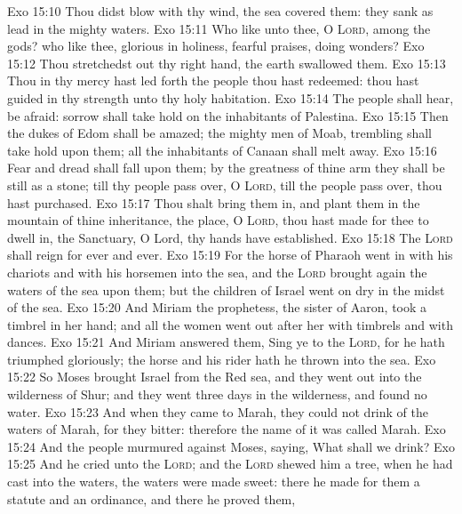 \vs Exo 15:10 Thou didst blow with thy wind, the sea covered them: they sank as lead in the mighty waters.
\vs Exo 15:11 Who  like unto thee, O \textsc{Lord}, among the gods? who  like thee, glorious in holiness, fearful  praises, doing wonders?
\vs Exo 15:12 Thou stretchedst out thy right hand, the earth swallowed them.
\vs Exo 15:13 Thou in thy mercy hast led forth the people  thou hast redeemed: thou hast guided  in thy strength unto thy holy habitation.
\vs Exo 15:14 The people shall hear,  be afraid: sorrow shall take hold on the inhabitants of Palestina.
\vs Exo 15:15 Then the dukes of Edom shall be amazed; the mighty men of Moab, trembling shall take hold upon them; all the inhabitants of Canaan shall melt away.
\vs Exo 15:16 Fear and dread shall fall upon them; by the greatness of thine arm they shall be  still as a stone; till thy people pass over, O \textsc{Lord}, till the people pass over,  thou hast purchased.
\vs Exo 15:17 Thou shalt bring them in, and plant them in the mountain of thine inheritance,  the place, O \textsc{Lord},  thou hast made for thee to dwell in,  the Sanctuary, O Lord,  thy hands have established.
\vs Exo 15:18 The \textsc{Lord} shall reign for ever and ever.
\vs Exo 15:19 For the horse of Pharaoh went in with his chariots and with his horsemen into the sea, and the \textsc{Lord} brought again the waters of the sea upon them; but the children of Israel went on dry  in the midst of the sea.
\vs Exo 15:20 And Miriam the prophetess, the sister of Aaron, took a timbrel in her hand; and all the women went out after her with timbrels and with dances.
\vs Exo 15:21 And Miriam answered them, Sing ye to the \textsc{Lord}, for he hath triumphed gloriously; the horse and his rider hath he thrown into the sea.
\vs Exo 15:22 So Moses brought Israel from the Red sea, and they went out into the wilderness of Shur; and they went three days in the wilderness, and found no water.
\vs Exo 15:23 And when they came to Marah, they could not drink of the waters of Marah, for they  bitter: therefore the name of it was called Marah.
\vs Exo 15:24 And the people murmured against Moses, saying, What shall we drink?
\vs Exo 15:25 And he cried unto the \textsc{Lord}; and the \textsc{Lord} shewed him a tree,  when he had cast into the waters, the waters were made sweet: there he made for them a statute and an ordinance, and there he proved them,
